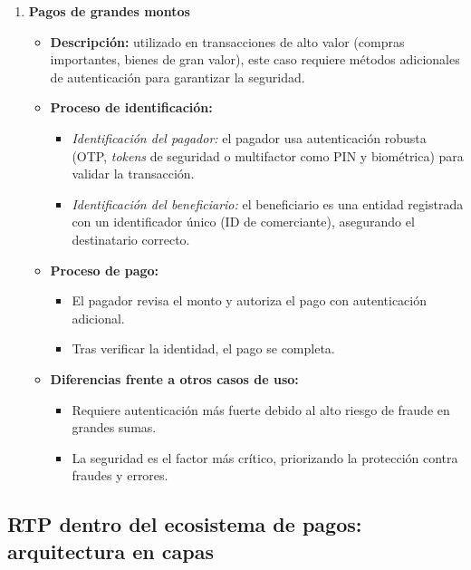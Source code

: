 \begin{enumerate}
    \item \textbf{Pagos de grandes montos}
    \begin{itemize}
        \item \textbf{Descripción:} utilizado en transacciones de alto valor (compras importantes, bienes de gran valor), este caso requiere métodos adicionales de autenticación para garantizar la seguridad.
        \item \textbf{Proceso de identificación:}
        \begin{itemize}
            \item \textit{Identificación del pagador:} el pagador usa autenticación robusta (OTP, \textit{tokens} de seguridad o multifactor como PIN y biométrica) para validar la transacción.
            \item \textit{Identificación del beneficiario:} el beneficiario es una entidad registrada con un identificador único (ID de comerciante), asegurando el destinatario correcto.
        \end{itemize}
        \item \textbf{Proceso de pago:}
        \begin{itemize}
            \item El pagador revisa el monto y autoriza el pago con autenticación adicional.
            \item Tras verificar la identidad, el pago se completa.
        \end{itemize}
        \item \textbf{Diferencias frente a otros casos de uso:}
        \begin{itemize}
            \item Requiere autenticación más fuerte debido al alto riesgo de fraude en grandes sumas.
            \item La seguridad es el factor más crítico, priorizando la protección contra fraudes y errores.
        \end{itemize}
    \end{itemize}
\end{enumerate}
\subsection{RTP dentro del ecosistema de pagos: arquitectura en capas}
\label{subsec:cubo-pagos}

